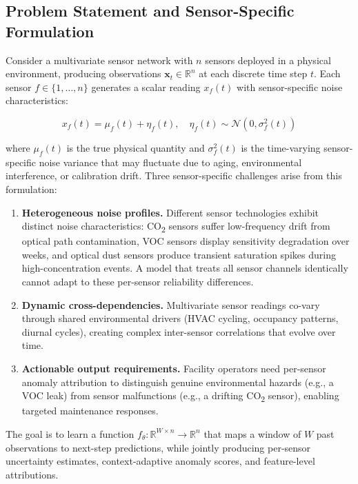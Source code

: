 
\subsection{Problem Statement and Sensor-Specific Formulation}

Consider a multivariate sensor network with $n$ sensors deployed in a physical environment, producing observations $\mathbf{x}_t \in \mathbb{R}^n$ at each discrete time step $t$. Each sensor $f \in \{1, \dots, n\}$ generates a scalar reading $x_f(t)$ with sensor-specific noise characteristics:

\begin{equation}
x_f(t) = \mu_f(t) + \eta_f(t), \quad \eta_f(t) \sim \mathcal{N}(0, \sigma_f^2(t))
\label{eq:sensor_model}
\end{equation}

where $\mu_f(t)$ is the true physical quantity and $\sigma_f^2(t)$ is the time-varying sensor-specific noise variance that may fluctuate due to aging, environmental interference, or calibration drift. Three sensor-specific challenges arise from this formulation:

\begin{enumerate}[leftmargin=*, nosep]
    \item \textbf{Heterogeneous noise profiles.} Different sensor technologies exhibit distinct noise characteristics: CO\textsubscript{2} sensors suffer low-frequency drift from optical path contamination, VOC sensors display sensitivity degradation over weeks, and optical dust sensors produce transient saturation spikes during high-concentration events. A model that treats all sensor channels identically cannot adapt to these per-sensor reliability differences.
    \item \textbf{Dynamic cross-dependencies.} Multivariate sensor readings co-vary through shared environmental drivers (HVAC cycling, occupancy patterns, diurnal cycles), creating complex inter-sensor correlations that evolve over time.
    \item \textbf{Actionable output requirements.} Facility operators need per-sensor anomaly attribution to distinguish genuine environmental hazards (e.g., a VOC leak) from sensor malfunctions (e.g., a drifting CO\textsubscript{2} sensor), enabling targeted maintenance responses.
\end{enumerate}

The goal is to learn a function $f_\theta: \mathbb{R}^{W \times n} \to \mathbb{R}^n$ that maps a window of $W$ past observations to next-step predictions, while jointly producing per-sensor uncertainty estimates, context-adaptive anomaly scores, and feature-level attributions.

